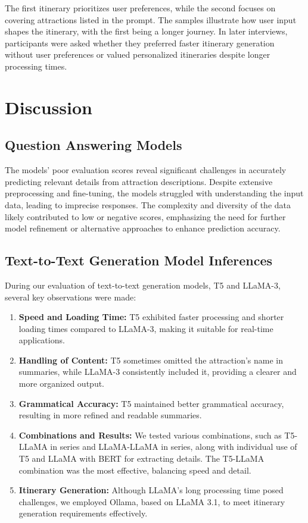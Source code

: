 \documentclass[conference]{IEEEtran}
\begin{document}
The first itinerary prioritizes user preferences, while the second focuses on covering attractions listed in the prompt. The samples illustrate how user input shapes the itinerary, with the first being a longer journey. In later interviews, participants were asked whether they preferred faster itinerary generation without user preferences or valued personalized itineraries despite longer processing times.




\section{Discussion}

    \subsection{Question Answering Models}

        The models' poor evaluation scores reveal significant challenges in accurately predicting relevant details from attraction descriptions. Despite extensive preprocessing and fine-tuning, the models struggled with understanding the input data, leading to imprecise responses. The complexity and diversity of the data likely contributed to low or negative scores, emphasizing the need for further model refinement or alternative approaches to enhance prediction accuracy.

\subsection{Text-to-Text Generation Model Inferences}

During our evaluation of text-to-text generation models, T5 and LLaMA-3, several key observations were made:

\begin{enumerate}
    \item \textbf{Speed and Loading Time:} T5 exhibited faster processing and shorter loading times compared to LLaMA-3, making it suitable for real-time applications.

    \item \textbf{Handling of Content:} T5 sometimes omitted the attraction's name in summaries, while LLaMA-3 consistently included it, providing a clearer and more organized output.

    \item \textbf{Grammatical Accuracy:} T5 maintained better grammatical accuracy, resulting in more refined and readable summaries.

    \item \textbf{Combinations and Results:} We tested various combinations, such as T5-LLaMA in series and LLaMA-LLaMA in series, along with individual use of T5 and LLaMA with BERT for extracting details. The T5-LLaMA combination was the most effective, balancing speed and detail.

    \item \textbf{Itinerary Generation:} Although LLaMA's long processing time posed challenges, we employed Ollama, based on LLaMA 3.1, to meet itinerary generation requirements effectively.
\end{enumerate}
\end{document}
